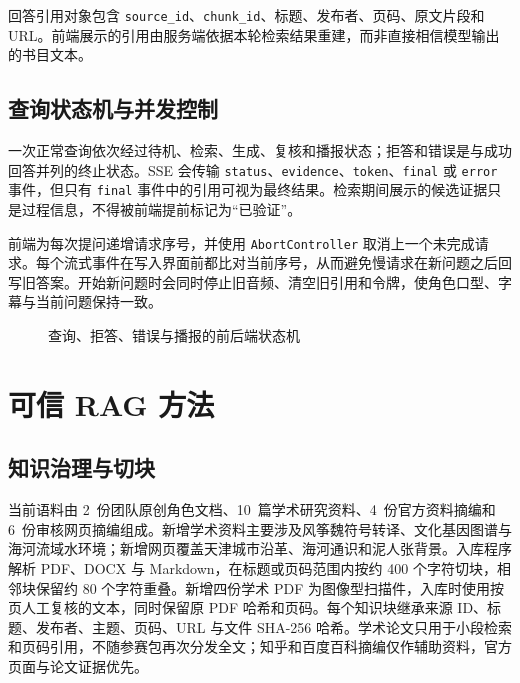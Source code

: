 \documentclass[UTF8,zihao=-4,fontset=none,twoside]{ctexart}
\newcommand{\code}[1]{\mbox{\texttt{#1}}\nobreak}
\begin{document}
回答引用对象包含 \code{source\_id}、\code{chunk\_id}、标题、发布者、页码、原文片段和 URL。前端展示的引用由服务端依据本轮检索结果重建，而非直接相信模型输出的书目文本。

\subsection{查询状态机与并发控制}

一次正常查询依次经过待机、检索、生成、复核和播报状态；拒答和错误是与成功回答并列的终止状态。SSE 会传输 \code{status}、\code{evidence}、\code{token}、\code{final} 或 \code{error} 事件，但只有 \code{final} 事件中的引用可视为最终结果。检索期间展示的候选证据只是过程信息，不得被前端提前标记为“已验证”。

前端为每次提问递增请求序号，并使用 \code{AbortController} 取消上一个未完成请求。每个流式事件在写入界面前都比对当前序号，从而避免慢请求在新问题之后回写旧答案。开始新问题时会同时停止旧音频、清空旧引用和令牌，使角色口型、字幕与当前问题保持一致。

\begin{figure}[htbp]
  \centering
  \resizebox{\linewidth}{!}{}
  \caption{查询、拒答、错误与播报的前后端状态机}
  \label{fig:query-state}
\end{figure}

\FloatBarrier

\section{可信 RAG 方法}

\subsection{知识治理与切块}

当前语料由 \mbox{2 份}团队原创角色文档、\mbox{10 篇}学术研究资料、\mbox{4 份}官方资料摘编和\mbox{6 份}审核网页摘编组成。新增学术资料主要涉及风筝魏符号转译、文化基因图谱与海河流域水环境\cite{jiang2024kite,kiteGeneMap,tan2002haihe}；新增网页覆盖天津城市沿革、海河通识和泥人张背景\cite{zhihuTianjinGeography,zhihuTianjinCity,tjrdHistory,baiduHaihe,ihchinaNiren,vcgBasketLady,thepaperNirenzhang}。入库程序解析 PDF、DOCX 与 Markdown，在标题或页码范围内按约 400 个字符切块，相邻块保留约 80 个字符重叠。新增四份学术 PDF 为图像型扫描件，入库时使用按页人工复核的文本，同时保留原 PDF 哈希和页码。每个知识块继承来源 ID、标题、发布者、主题、页码、URL 与文件 SHA-256 哈希。学术论文只用于小段检索和页码引用，不随参赛包再次分发全文；知乎和百度百科摘编仅作辅助资料，官方页面与论文证据优先。
\end{document}
